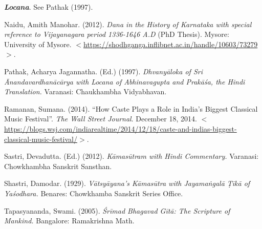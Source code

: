 \begin{thebibliography}{99}
  \textit{\textbf{Locana}}. See Pathak (1997).

  Naidu, Amith Manohar. (2012). \textit{Dana in the History of Karnataka with special reference to Vijayanagara period 1336-1646 A.D} (PhD Thesis). Mysore: University of Mysore. $<$\url{https://shodhganga.inflibnet.ac.in/handle/10603/73279}$>$.

  Pathak, Acharya Jagannatha. (Ed.) (1997). \textit{Dhvanyāloka of Sri Ānandavardhanācārya with Locana of Abhinavagupta and Prakāśa, the Hindi Translation.} Varanasi: Chaukhambha Vidyabhavan.

  Ramanan, Sumana. (2014). “How Caste Plays a Role in India’s Biggest Classical Music Festival”. \textit{The Wall Street Journal}. December 18, 2014. $<$\url{https://blogs.wsj.com/indiarealtime/2014/12/18/caste-and-indias-biggest-classical-music-festival/}$>$.

  Sastri, Devadutta. (Ed.) (2012). \textit{Kāmasūtram with Hindi Commentary.} Varanasi: Chowkhambha Sanskrit Sansthan.

  Shastri, Damodar. (1929). \textit{Vātsyāyana’s Kāmasūtra with Jayamaṅgalā Ṭīkā of Yaśodhara.} Benares: Chowkhamba Sanskrit Series Office.

  Tapasyananda, Swami. (2005). \textit{Śrīmad Bhagavad Gītā: The Scripture of Mankind.} Bangalore: Ramakrishna Math.

 \end{thebibliography}
\vskip 5pt

\theendnotes

\label{endchapter7}
